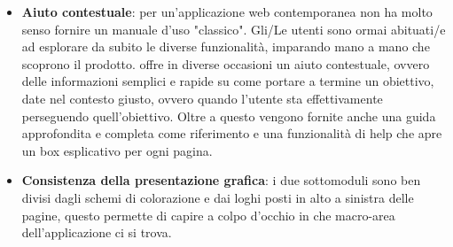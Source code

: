 \begin{itemize}
\item \textbf{Aiuto contestuale}: per un'applicazione web contemporanea non ha molto senso
fornire un manuale d'uso "classico". Gli/Le utenti sono ormai abituati/e ad esplorare da
subito le diverse funzionalità, imparando mano a mano che scoprono il prodotto.
\fiscoloWeb{} offre in diverse occasioni un aiuto contestuale, ovvero delle informazioni
semplici e rapide su come portare a termine un obiettivo, date nel contesto giusto, ovvero
quando l'utente sta effettivamente perseguendo quell'obiettivo. Oltre a questo vengono
fornite anche una guida approfondita e completa come riferimento e una funzionalità di help
che apre un box esplicativo per ogni pagina.
\item \textbf{Consistenza della presentazione grafica}: i due sottomoduli sono ben divisi
dagli schemi di colorazione e dai loghi posti in alto a sinistra delle pagine, questo permette
di capire a colpo d'occhio in che macro-area dell'applicazione ci si trova.
\end{itemize}